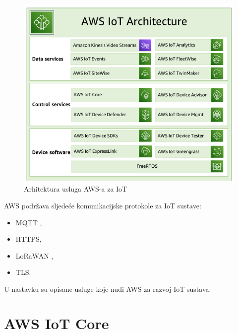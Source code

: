 \begin{figure}[ht]
	\centering
	\includegraphics[scale=0.8]{imgs/aws_iot_arch}
	\caption{Arhitektura usluga AWS-a za IoT \cite{aws_docs}}
	\label{fig:aws_iot_arch}
\end{figure}

AWS podržava sljedeće komunikacijske protokole za IoT sustave:
\begin{itemize}
	\item MQTT ,
	\item HTTPS,
	\item LoRaWAN ,
	\item TLS.
\end{itemize}

U nastavku su opisane usluge koje nudi AWS za razvoj IoT sustava.

\section{AWS IoT Core}

